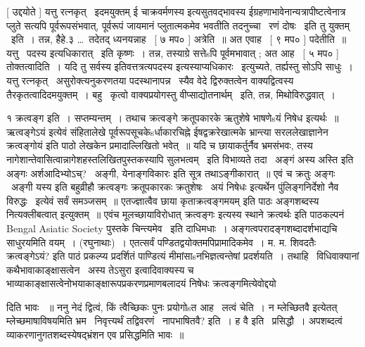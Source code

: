 \documentclass[11pt, openany]{book}
\begin{document}
 [ उद्दयोते ] यत्तु रत्नकृत् \textendash\ इदमयुक्तम् {\qt ई चाक्रवर्मणस्य}
इत्यसुतवद्भावस्य {\qt ई}ग्रहणाभावेनान्यत्रापीष्टत्वेनात्र प्लुते सत्यपि
पूर्वरूपसंभवात्, पूर्वरूपं जायमानं प्लुतात्मकमेव भवतीति तदनुच्चा \textendash\ रणं
दोषः \textendash\ इति तु {\qt युक्तम्} \textendash\ इति~। तन्न, हैहे.३ \ldots \textendash\ तदेतद्
ध्यनयन्नाह \textendash\ [ ७ मप० ] अत्रेति~॥ अत एवाह \textendash\ [ ९ मप० ] पदेतीति~॥
यत्तु \textendash\ {\qt पदस्य} इत्यधिकारात् \textendash\ इति कृष्णः~। तन्न, तस्याग्रे सत्तेsपि
पूर्वमभावात् ; अत आह \textendash\ [ ५ मप० ] तोक्तत्वादिति~। यदि तु {\qt सर्वस्य
इतिवत्तत्रत्यपदस्य} इत्यस्याप्यधिकारः \textendash\ इत्युच्यते, तर्ह्यस्तु सोऽपि
साधुः~। यत्तु रत्नकृत् \textendash\ असुरोक्त्यनुकरणतया पदस्थानापन्न \textendash\ स्यैव वेदे
द्विरुक्तत्वेन वाक्यद्वित्वस्य तैरकृतत्वादिदमयुक्तम्~। बहु \textendash\ कृत्वो
वाक्यप्रयोगस्तु वीप्साद्योतनार्थम् \textendash\ इति, तन्न, मिथोविरुद्धवात्~। 



१ क्रत्वङ्ग इति~। सप्तम्यन्तम्~। तथाच क्रत्वङ्गे क्रतूपकारके ऋतुशेषे
भाषणेsयं निषेध इत्यर्थः~॥ {\qt ऋत्वङ्गेऽयं इत्येवं संहितालेखे
पूर्वरूपसूचकेsर्धाकारचिह्ने ईषद्वक्ररेखात्मके भ्रान्त्या सरललेखाज्ञानेन}
क्रत्वङ्गोयं इति पाठो लेखकेन प्रमादाल्लिखितो भवेत्~॥ यदि च
छायाकर्तुर्नैव भ्रमसंभवः, तस्य
नागेशान्तेवासित्वान्नागेशहस्तलिखितपुस्तकस्यापि सुलभत्वम् \textendash\ इति विभाव्यते
तदा \textendash\ अङ्गं अस्य अस्ति इति अङ्गः {\qt अर्शआदिभ्योऽच्?} \textendash\ अङ्गी,
{\qt येनाङ्गविकारः} इति सूत्र तथाऽङ्गीकारात्~॥ एवं च {\qt क्रतुः अङ्गः \textendash\ अङ्गी
यस्य} इति बहुव्रीहौ {\qt क्रत्वङ्गः क्रतूपकारकः क्रतुशेषः \textendash\ अयं निषेधः
इत्यर्थेन पुंलिङ्गनिर्देशो नैव विरुद्धः \textendash\ इत्येवं सर्वं समञ्जसम्~॥
एतज्ज्ञात्वैव छाया कृताक्रत्वङ्गमयम्} इति पाठः {\qt अङ्गशब्दस्य}
नित्यक्लीबत्वात् इत्युक्तम्~॥ एवंच मूलच्छायाविरोधात् {\qt क्रत्वङ्गः}
इत्यस्य स्थाने क्रत्वर्थः इति पाठकल्पनं Bengal Asiatic Society पुस्तके
चिन्त्यमेव \textendash\ इति दाधिमधाः~। {\qt अङ्गत्वपरादङ्गशब्दादर्शभाद्यचि} साधुरयमिति
वयम्~। (रघुनाथाः)~। एतत्सर्वं पण्डितद्वयोक्तमपिप्रामादिकमेव~। म. म.
शिवदतैः क्रत्वङ्गेऽयं? इति पाठं प्रकल्प्य प्रदर्शितं पाण्डित्यं
मीमांसाsनभिज्ञत्वन्तेषां प्रदर्शयति~। तथाहि \textendash\ विधिवाक्यानां
कथैभावाकाङ्क्षासत्वेन \textendash\ अस्य तेऽसुरा इत्वादिवाक्यस्य च
भाव्याकाङ्क्षासत्वेनोभयाकाङ्क्षारूपप्रकरणप्रमाणबलादयं निषेधः
क्रत्वङ्गमित्येवोद्दयो \textendash\ 





दिति भावः ~॥ ननु नेदं द्वित्वं, किं त्वैच्छिकः पुनः प्रयोगोsत आह \textendash\ लत्वं
चेति~। {\qt न म्लेच्छितवै} इत्येतत् म्लेच्छमाषाविषयमिति
भ्रम \textendash\ निवृत्त्यर्थं तद्विवरणं \textendash\ नापभाषितवै? इति~। {\qt ह वै}
इति \textendash\ प्रसिद्धौ~। अपशब्दत्वं व्याकरणानुगतशब्दस्येषद्भ्रंशन एव प्रसिद्धमिति
भावः~॥ 
\end{document}

